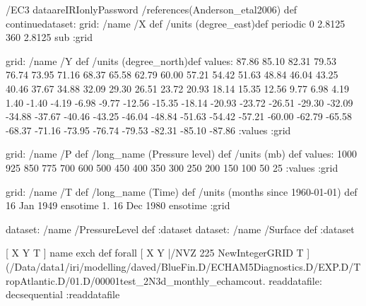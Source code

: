 \begin{ingrid}
/EC3 dataareIRIonlyPassword
/references(Anderson_etal2006) def
continuedataset:
grid:
/name /X def
/units (degree_east)def
 periodic
 0 2.8125 360  2.8125 sub
:grid

grid:
/name /Y def
/units (degree_north)def
values:
87.86 85.10 82.31 79.53 76.74 73.95 71.16 68.37
 65.58 62.79 60.00 57.21 54.42 51.63 48.84 46.04 43.25 40.46
 37.67 34.88 32.09 29.30 26.51 23.72 20.93 18.14 15.35 12.56
 9.77  6.98  4.19  1.40   -1.40   -4.19   -6.98   -9.77  -12.56  -15.35
 -18.14  -20.93  -23.72  -26.51  -29.30  -32.09  -34.88  -37.67  -40.46  -43.25
 -46.04  -48.84  -51.63  -54.42  -57.21  -60.00  -62.79  -65.58  -68.37  -71.16
 -73.95  -76.74  -79.53  -82.31  -85.10  -87.86
:values
:grid

grid:
/name /P def
/long_name (Pressure level) def
/units (mb) def
values:
1000 925 850 775 700 600 500 450 400 350 300 250 200 150 100 50 25
:values
:grid

grid:
/name /T def
/long_name (Time) def
/units (months since 1960-01-01) def
16 Jan 1949 ensotime
1.
16 Dec 1980 ensotime
:grid

dataset: /name /PressureLevel def :dataset
dataset: /name /Surface def :dataset

[ X Y T ] { name exch def } forall
[ X Y |/NVZ 225 NewIntegerGRID T ]
(/Data/data1/iri/modelling/daved/BlueFin.D/ECHAM5Diagnostics.D/EXP.D/TropAtlantic.D/01.D/00001test_2N3d_monthly_echamcout.%
readdatafile:
decsequential
:readdatafile


\end{ingrid}
